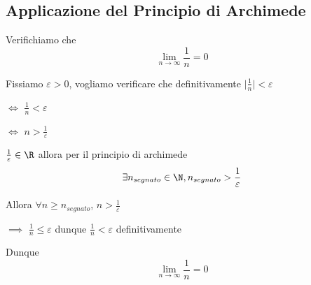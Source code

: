 \subsection{Applicazione del Principio di Archimede}

Verifichiamo che \[
    \lim_{n\to \infty}\frac{1}{n}=0 
\]

Fissiamo $ \varepsilon>0 $, vogliamo verificare che definitivamente $ \bigg|\frac{1}{n}\bigg|<\varepsilon$

$\iff$ $\frac{1}{n}<\varepsilon$

$ \iff $ $ n>\frac{1}{\varepsilon} $

$ \frac{1}{\varepsilon} \in \R $ allora per il principio di archimede \[
    \exists n_{segnato} \in \N, n_{segnato}>\frac{1}{\varepsilon}  
\]

Allora $ \forall n \ge n_{segnato}  $, $ n>\frac{1}{\varepsilon} $ 

$\implies$ $ \frac{1}{n}\le \varepsilon $ dunque $ \frac{1}{n}<\varepsilon $ definitivamente

Dunque \[
    \lim_{n\to \infty} \frac{1}{n}=0
\]


